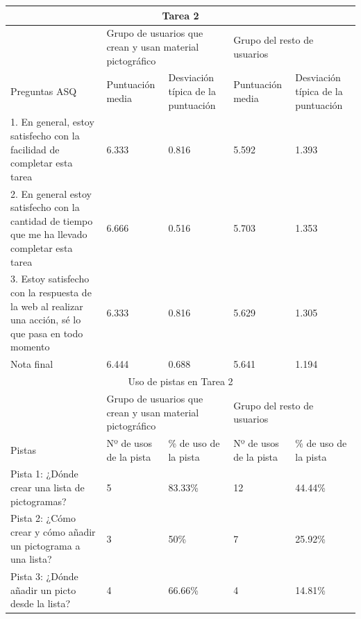 \begin{tabular}{ |p{4cm}|p{2cm}|p{2cm}|p{2cm}|p{2cm}|  }
	\hline
	\multicolumn{5}{|c|}{Tarea 2} \\
	\hline
	& \multicolumn{2}{|p{4cm}|}{Grupo de usuarios que crean y usan material pictográfico} & \multicolumn{2}{|p{4cm}|}{Grupo del resto de usuarios }  \\ 
	\hline
	Preguntas ASQ & Puntuación media  &Desviación típica de la puntuación & Puntuación media & Desviación típica de la puntuación\\
	\hline
	1. En general, estoy satisfecho con la facilidad de completar esta tarea &6.333  &0.816 &5.592 &1.393\\
	\hline
	2. En general estoy satisfecho con la cantidad de tiempo que me ha llevado completar esta tarea &6.666  &0.516 &5.703 &1.353\\
	\hline
	3. Estoy satisfecho con la respuesta de la web al realizar una acción, sé lo que pasa en todo momento &6.333 &0.816 &5.629   &1.305\\
	\hline
	Nota final &6.444 &0.688 &5.641  &1.194\\
	\hline
	\multicolumn{5}{|c|}{Uso de pistas en Tarea 2} \\
	\hline
	& \multicolumn{2}{|p{4cm}|}{Grupo de usuarios que crean y usan material pictográfico} & \multicolumn{2}{|p{4cm}|}{Grupo del resto de usuarios }  \\ 
	\hline
	Pistas &Nº de usos de la pista &\% de uso de la pista&Nº de usos de la pista&\% de uso de la pista\\
	\hline
	Pista 1: ¿Dónde crear una lista de pictogramas? &5  &83.33\% &12 &44.44\%\\
	\hline
	Pista 2: ¿Cómo crear y cómo añadir un pictograma a una lista? &3  &50\%  &7 &25.92\%\\
	\hline
	Pista 3: ¿Dónde añadir un picto desde la lista? &4 &66.66\% &4  &14.81\%\\
	\hline
\end{tabular}


